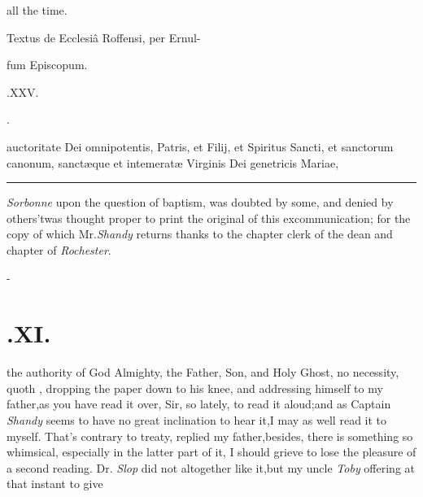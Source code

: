 \documentclass{article}
\begin{document}
all the time.

\null\smallskip
\centerline{Textus de Ecclesiâ Roffensi, per Ernul-}
\centerline{fum Episcopum.}
\bigskip
\centerline{\large{}.\quad XXV.}
\bigskip
\centerline{\large{}.}

 auctoritate Dei omnipotentis, Patris, et Filij, et Spiritus Sancti, et
sanctorum canonum, sanctæque et intemeratæ Virginis Dei genetricis Mariae,

\vfill
\bgroup\fontsize{8}{10}\selectfont
\hrule
{} \textit{Sor\-bonne} upon the question of
baptism, was doubted by some, and denied by others\tsh ’twas
thought proper to print the original of this excommunication; for the copy of
which Mr.\@ \textit{Shandy} returns thanks to the chapter clerk of the dean and
chapter of \textit{Rochester}.\par
\egroup
{}
\newpage
\null\kern-\baselineskip
\section{.\quad  XI.}

the authority of God Almighty, the Father, Son, and Holy Ghost,
no necessity, quoth \drslop, dropping the paper down to his knee, and
addressing himself to my father,\tsh as you have read it over, Sir, so lately, to
read it aloud;\tsk\break and as Captain \textit{Shandy} seems to have no great inclination
to hear it,\tsh I may as well read it to myself. That’s contrary to treaty, replied
my father,\tsk besides, there is something so whimsical, especially in the latter
part of it, I should grieve to\break
lose the pleasure of a second reading.  Dr.\break
\textit{Slop} did not altogether like it,\tsh but my\break
uncle \textit{Toby} offering at that instant to give
\end{document}
